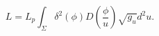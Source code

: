 \begin{equation}
L=L_p\int_\Sigma \delta ^2(\phi )D\left( \frac{\phi}{u}  \right)
\sqrt{g_u}d^2u. \label{iL}
\end{equation}

